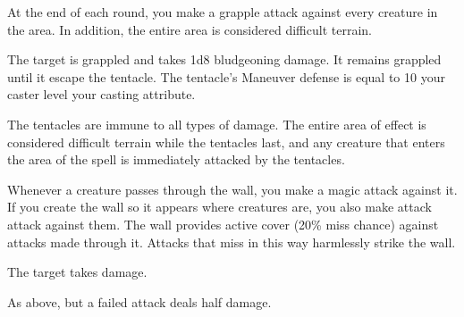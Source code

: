 \spellrng{\rngmed}
\begin{spelleffect}
    At the end of each round, you make a grapple attack against every creature in the area. In addition, the entire area is considered difficult terrain.
\end{spelleffect}
\begin{spellsuccess}
    The target is grappled and takes 1d8 bludgeoning damage. It remains grappled until it escape the tentacle. The tentacle's Maneuver defense is equal to 10 \add your caster level \add your casting attribute.
\end{spellsuccess}
\begin{spellnotes}
  \par The tentacles are immune to all types of damage. The entire area of effect is considered difficult terrain while the tentacles last, and any creature that enters the area of the spell is immediately attacked by the tentacles.
\end{spellnotes}

\spellrng{\rngmed}
\begin{spelleffect}
    Whenever a creature passes through the wall, you make a magic attack against it. If you create the wall so it appears where creatures are, you also make attack attack against them. The wall provides active cover (20\% miss chance) against attacks made through it. Attacks that miss in this way harmlessly strike the wall.
\end{spelleffect}
\begin{spellsuccess}
    The target takes damage.
\end{spellsuccess}
\begin{spellfailure}
    As above, but a failed attack deals half damage.
\end{spellfailure}


